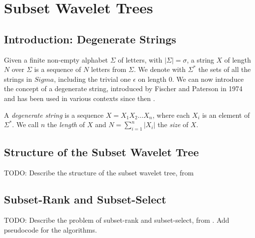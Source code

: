 
\chapter{Subset Wavelet Trees}
\label{ch:Chapter4}

\section{Introduction: Degenerate Strings}
Given a finite non-empty alphabet $\Sigma$ of letters, with $|\Sigma| = \sigma$, a string $X$ of length $N$ over $\Sigma$ is a sequence of $N$ letters from $\Sigma$. We denote with $\Sigma^*$ the sets of all the strings in $Sigma$, including the trivial one $\epsilon$ on length $0$. We can now introduce the concept of a degenerate string, introduced by Fischer and Paterson in 1974 \cite{fischer1974string} and has been used in various contexts since then \cite{alzamel2018degenerate}.

\begin{definition}\label{def:degenerate_string}
    A \emph{degenerate string} is a sequence $X = X_1 X_2 \ldots X_n$, where each $X_i$ is an element of $\Sigma^*$. We call $n$ the \emph{length} of $X$ and $N = \sum_{i=1}^{n} |X_i|$ the \emph{size} of $X$.
\end{definition}




\section{Structure of the Subset Wavelet Tree}
TODO: Describe the structure of the subset wavelet tree, from \cite{SubsetWT}

\section{Subset-Rank and Subset-Select}
TODO: Describe the problem of subset-rank and subset-select, from \cite{SubsetWT}. Add pseudocode for the algorithms.

